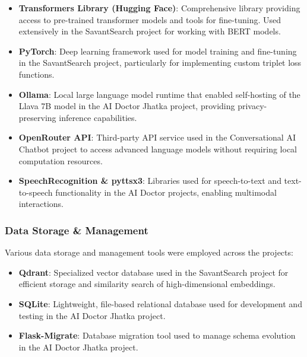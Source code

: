 \documentclass[12pt,a4paper]{article}
\begin{document}
\begin{itemize}
    \item \textbf{Transformers Library (Hugging Face)}: Comprehensive library providing access to pre-trained transformer models and tools for fine-tuning. Used extensively in the SavantSearch project for working with BERT models.
    
    \item \textbf{PyTorch}: Deep learning framework used for model training and fine-tuning in the SavantSearch project, particularly for implementing custom triplet loss functions.
    
    \item \textbf{Ollama}: Local large language model runtime that enabled self-hosting of the Llava 7B model in the AI Doctor Jhatka project, providing privacy-preserving inference capabilities.
    
    \item \textbf{OpenRouter API}: Third-party API service used in the Conversational AI Chatbot project to access advanced language models without requiring local computation resources.
    
    \item \textbf{SpeechRecognition \& pyttsx3}: Libraries used for speech-to-text and text-to-speech functionality in the AI Doctor projects, enabling multimodal interactions.
\end{itemize}

\subsubsection{Data Storage \& Management}
Various data storage and management tools were employed across the projects:

\begin{itemize}
    \item \textbf{Qdrant}: Specialized vector database used in the SavantSearch project for efficient storage and similarity search of high-dimensional embeddings.
    
    \item \textbf{SQLite}: Lightweight, file-based relational database used for development and testing in the AI Doctor Jhatka project.
    
    \item \textbf{Flask-Migrate}: Database migration tool used to manage schema evolution in the AI Doctor Jhatka project.
\end{itemize}
\end{document}
